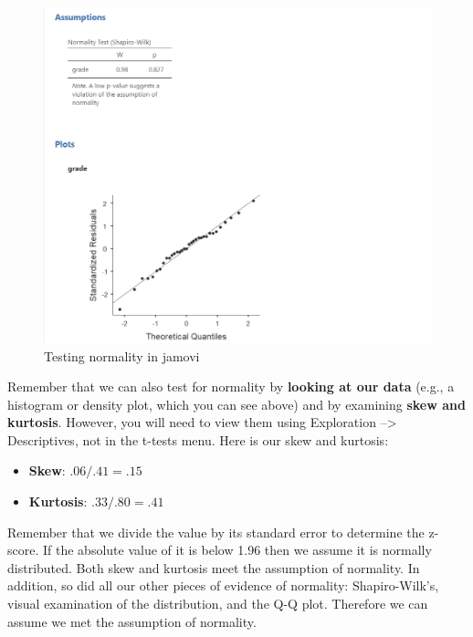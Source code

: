 \documentclass[
]{book}
\begin{document}
\begin{figure}

{\centering \includegraphics[width=1\linewidth]{images/02-independent_t-test/independent_t-test_normality} 

}

\caption{Testing normality in jamovi}\label{fig:unnamed-chunk-4}
\end{figure}

Remember that we can also test for normality by \textbf{looking at our data} (e.g., a histogram or density plot, which you can see above) and by examining \textbf{skew and kurtosis}. However, you will need to view them using Exploration --\textgreater{} Descriptives, not in the t-tests menu. Here is our skew and kurtosis:

\begin{itemize}
\item
  \textbf{Skew}: \(.06/.41 = .15\)
\item
  \textbf{Kurtosis}: \(.33/.80 = .41\)
\end{itemize}

Remember that we divide the value by its standard error to determine the z-score. If the absolute value of it is below 1.96 then we assume it is normally distributed. Both skew and kurtosis meet the assumption of normality. In addition, so did all our other pieces of evidence of normality: Shapiro-Wilk's, visual examination of the distribution, and the Q-Q plot. Therefore we can assume we met the assumption of normality.
\end{document}
